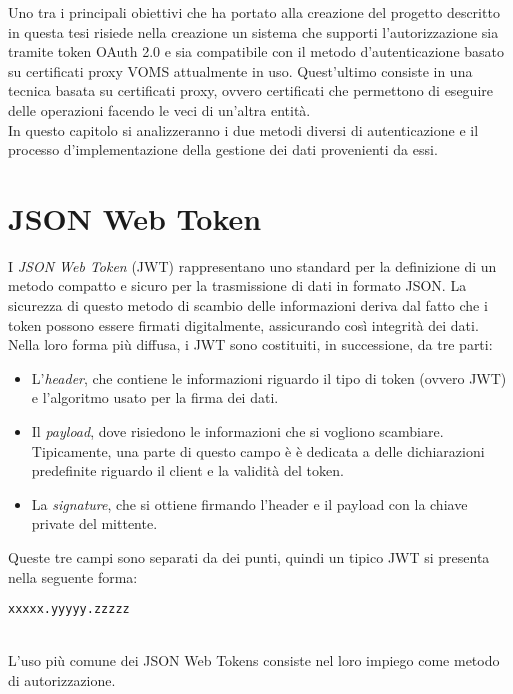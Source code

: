 Uno tra i principali obiettivi che ha portato alla creazione del progetto descritto in questa tesi 
risiede nella creazione un sistema che supporti 
l'autorizzazione sia tramite token OAuth 2.0 e sia compatibile con il metodo d'autenticazione basato su certificati proxy VOMS attualmente in uso.  
Quest'ultimo consiste in una tecnica basata su certificati proxy, ovvero certificati che permettono di eseguire delle operazioni facendo le veci di un'altra entità. 
\\ In questo capitolo si analizzeranno i due metodi diversi di autenticazione e il processo d'implementazione della gestione 
dei dati provenienti da essi.

\section{JSON Web Token}
I \textit{JSON Web Token} (JWT) \cite{JWT_rfc} rappresentano uno standard per la definizione di un metodo 
compatto e sicuro per la trasmissione di dati in formato JSON. La sicurezza di questo metodo di scambio delle 
informazioni deriva dal fatto che i token possono essere firmati digitalmente, assicurando così integrità dei dati.  
\\ Nella loro forma più diffusa, i JWT sono costituiti, in successione, da tre parti:
\begin{itemize}
    \item L'\textit{header}, che contiene le informazioni riguardo il tipo di token (ovvero JWT) e 
    l'algoritmo usato per la firma dei dati. 
    \item Il \textit{payload}, dove risiedono le informazioni che si vogliono scambiare. Tipicamente, una parte di questo campo è 
    è dedicata a delle dichiarazioni predefinite riguardo il client e la validità del token. 
    \item La \textit{signature}, che si ottiene firmando l'header e il payload con la chiave private del mittente.
\end{itemize}
Queste tre campi sono separati da dei punti, quindi un tipico JWT si presenta nella seguente forma:
\\ \centerline{\texttt{xxxxx.yyyyy.zzzzz}}
\\ L'uso più comune dei JSON Web Tokens consiste nel loro impiego come metodo di autorizzazione.

